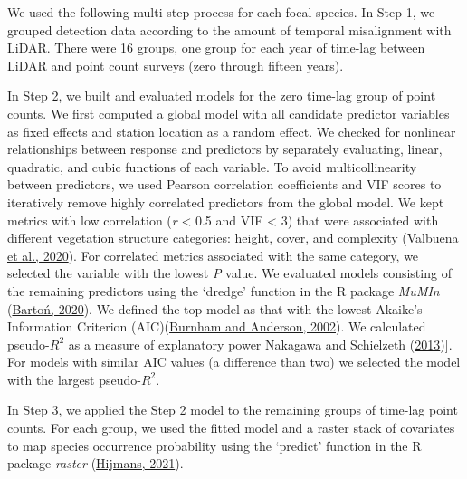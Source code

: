 \documentclass[
  12pt,
]{article}
\begin{document}
We used the following multi-step process for each focal species. In Step 1, we grouped detection data according to the amount of temporal misalignment with LiDAR. There were 16 groups, one group for each year of time-lag between LiDAR and point count surveys (zero through fifteen years).

In Step 2, we built and evaluated models for the zero time-lag group of point counts. We first computed a global model with all candidate predictor variables as fixed effects and station location as a random effect. We checked for nonlinear relationships between response and predictors by separately evaluating, linear, quadratic, and cubic functions of each variable. To avoid multicollinearity between predictors, we used Pearson correlation coefficients and VIF scores to iteratively remove highly correlated predictors from the global model. We kept metrics with low correlation (\emph{r} \textless{} 0.5 and VIF \textless{} 3) that were associated with different vegetation structure categories: height, cover, and complexity (\protect\hyperlink{ref-valbuenaStandardizingEcosystemMorphological2020}{Valbuena et al., 2020}). For correlated metrics associated with the same category, we selected the variable with the lowest \emph{P} value. We evaluated models consisting of the remaining predictors using the `dredge' function in the R package \emph{MuMIn} (\protect\hyperlink{ref-bartonMuMInMultimodelInference2020}{Bartoń, 2020}). We defined the top model as that with the lowest Akaike's Information Criterion (AIC)(\protect\hyperlink{ref-burnhamModelSelectionMultimodel2002}{Burnham and Anderson, 2002}). We calculated pseudo-\(R^2\) as a measure of explanatory power Nakagawa and Schielzeth (\protect\hyperlink{ref-nakagawaGeneralSimpleMethod2013}{2013}){]}. For models with similar AIC values (a difference than two) we selected the model with the largest pseudo-\(R^2\).

In Step 3, we applied the Step 2 model to the remaining groups of time-lag point counts. For each group, we used the fitted model and a raster stack of covariates to map species occurrence probability using the `predict' function in the R package \emph{raster} (\protect\hyperlink{ref-hijmansRasterGeographicData2021}{Hijmans, 2021}).
\end{document}
